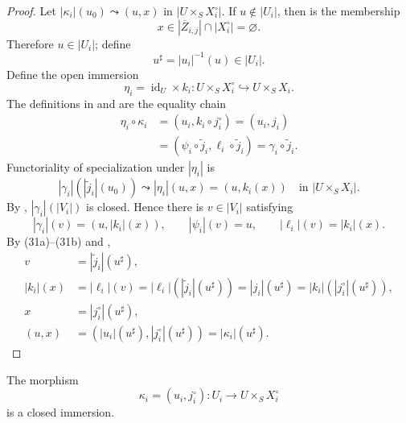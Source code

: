 \begin{proof}
  Let $|\kappa_i|(u_0)\leadsto(u,x)$ in $|U\times_SX_i^\circ|$.  If
  $u\notin|U_i|$, then
   is the membership
  \[
    x\in|\overline Z_{i,j}|\cap|X_i^\circ|=\varnothing.
  \]
  Therefore $u\in|U_i|$; define
  \[
    u^\sharp=|u_i|^{-1}(u)\in|U_i|.                               \tag{31a}
  \]
  Define the open immersion
  \[
    \eta_i=\operatorname{id}_U\times k_i\colon
      U\times_SX_i^\circ\hookrightarrow U\times_SX_i.
  \]
  The definitions in
   and
   are the equality chain
  \[
  \begin{aligned}
    \eta_i\circ\kappa_i
      &=(u_i,k_i\circ j_i^\circ)
       =(u_i,j_i)\\
      &=(\psi_i\circ\widetilde j_i,
          \ell_i\circ\widetilde j_i)
       =\gamma_i\circ\widetilde j_i.
  \end{aligned}
  \]
  Functoriality of specialization under $|\eta_i|$ is
  \[
    |\gamma_i|(|\widetilde j_i|(u_0))
      \leadsto|\eta_i|(u,x)
      =(u,k_i(x))
      \quad\text{in }|U\times_SX_i|.
  \]
  By ,
  $|\gamma_i|(|V_i|)$ is closed.  Hence there is $v\in|V_i|$ satisfying
  \[
    |\gamma_i|(v)=(u,|k_i|(x)),\qquad
    |\psi_i|(v)=u,\qquad
    |\ell_i|(v)=|k_i|(x).                                         \tag{31b}
  \]
  By (31a)--(31b) and
  ,
  \[
  \begin{aligned}
    v
      &=|\widetilde j_i|(u^\sharp),\\
    |k_i|(x)
      &=|\ell_i|(v)
       =|\ell_i|(|\widetilde j_i|(u^\sharp))
       =|j_i|(u^\sharp)
       =|k_i|(|j_i^\circ|(u^\sharp)),\\
    x&=|j_i^\circ|(u^\sharp),\\
    (u,x)
      &=(|u_i|(u^\sharp),|j_i^\circ|(u^\sharp))
       =|\kappa_i|(u^\sharp).
  \end{aligned}
  \]
\end{proof}

\begin{lemma}
  \label{lemma:nagata-intermediate-overlap-closed}

  The morphism
  \[
    \kappa_i=(u_i,j_i^\circ)\colon U_i\to U\times_SX_i^\circ
  \]
  is a closed immersion.
\end{lemma}

